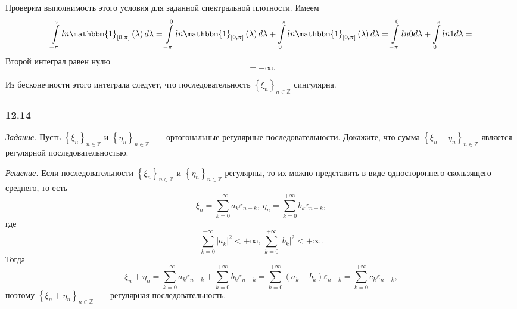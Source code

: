 Проверим выполнимость этого условия для заданной спектральной плотности.
Имеем
\begin{equation*}
  \int \limits_{-\pi }^{ \pi }
    ln \mathbbm{1}_{ \left[ 0, \pi \right] } \left( \lambda \right) d \lambda =
  \int \limits_{-\pi }^0 ln \mathbbm{1}_{ \left[ 0, \pi \right] } \left( \lambda \right) d \lambda +
  \int \limits_0^{ \pi } ln \mathbbm{1}_{ \left[ 0, \pi \right] } \left( \lambda \right) d \lambda =
  \int \limits_{-\pi }^0 ln 0 d \lambda + \int \limits_0^{ \pi } ln 1 d \lambda =
\end{equation*}
Второй интеграл равен нулю
\begin{equation*}
  = -\infty.
\end{equation*}

Из бесконечности этого интеграла следует,
что последовательность $ \left\{ \xi_n \right\}_{n \in \mathbb{Z}}$ сингулярна.

\subsubsection*{12.14}

\textit{Задание.}
Пусть $ \left\{ \xi_n \right\}_{n \in \mathbb{Z}}$ и
$ \left\{ \eta_n \right\}_{n \in \mathbb{Z}}$~---~ортогональные регулярные последовательности.
Докажите, что сумма $ \left\{ \xi_n + \eta_n \right\}_{n \in \mathbb{Z}}$
является регулярной последовательностью.

\textit{Решение.}
Если последовательности $ \left\{ \xi_n \right\}_{n \in \mathbb{Z}}$ и
$ \left\{ \eta_n \right\}_{n \in \mathbb{Z}}$ регулярны,
то их можно представить в виде одностороннего скользящего среднего, то есть
\begin{equation*}
  \xi_n = \sum \limits_{k = 0}^{+\infty } a_k \varepsilon_{n - k}, \,
  \eta_n = \sum \limits_{k = 0}^{+\infty } b_k \varepsilon_{n - k},
\end{equation*}
где
\begin{equation*}
  \sum \limits_{k = 0}^{+\infty } \left| a_k \right|^2 < +\infty, \,
  \sum \limits_{k = 0}^{+\infty } \left| b_k \right|^2 < +\infty.
\end{equation*}
Тогда
\begin{equation*}
  \xi_n + \eta_n =
  \sum \limits_{k = 0}^{+\infty } a_k \varepsilon_{n - k} +
  \sum \limits_{k = 0}^{+\infty } b_k \varepsilon_{n - k} =
  \sum \limits_{k = 0}^{+\infty } \left( a_k + b_k \right) \varepsilon_{n - k} =
  \sum \limits_{k = 0}^{+\infty } c_k \varepsilon_{n - k},
\end{equation*}
поэтому $ \left\{ \xi_n + \eta_n \right\}_{n \in \mathbb{Z}}$~---~регулярная последовательность.

